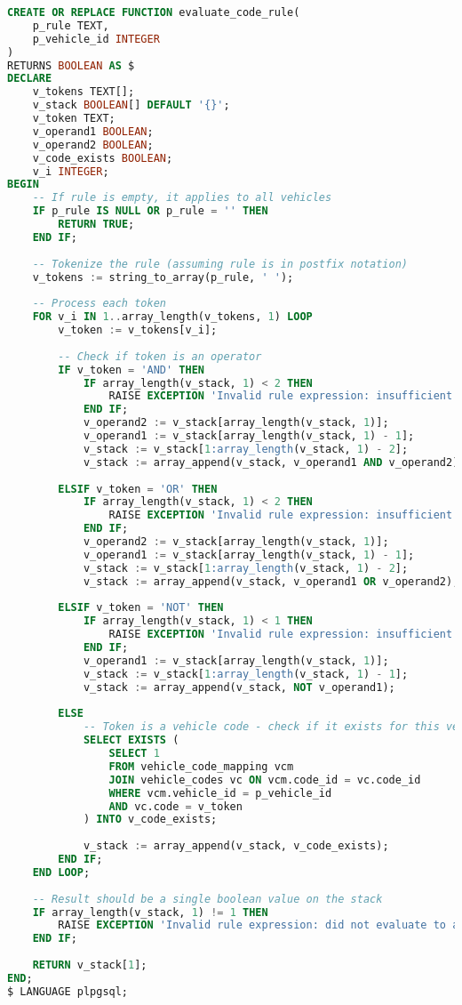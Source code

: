\begin{lstlisting}[language=SQL, caption={Code Rule Evaluation Implementation}, label={lst:code-rule-evaluation}]
CREATE OR REPLACE FUNCTION evaluate_code_rule(
    p_rule TEXT,
    p_vehicle_id INTEGER
)
RETURNS BOOLEAN AS $
DECLARE
    v_tokens TEXT[];
    v_stack BOOLEAN[] DEFAULT '{}';
    v_token TEXT;
    v_operand1 BOOLEAN;
    v_operand2 BOOLEAN;
    v_code_exists BOOLEAN;
    v_i INTEGER;
BEGIN
    -- If rule is empty, it applies to all vehicles
    IF p_rule IS NULL OR p_rule = '' THEN
        RETURN TRUE;
    END IF;
    
    -- Tokenize the rule (assuming rule is in postfix notation)
    v_tokens := string_to_array(p_rule, ' ');
    
    -- Process each token
    FOR v_i IN 1..array_length(v_tokens, 1) LOOP
        v_token := v_tokens[v_i];
        
        -- Check if token is an operator
        IF v_token = 'AND' THEN
            IF array_length(v_stack, 1) < 2 THEN
                RAISE EXCEPTION 'Invalid rule expression: insufficient operands for AND';
            END IF;
            v_operand2 := v_stack[array_length(v_stack, 1)];
            v_operand1 := v_stack[array_length(v_stack, 1) - 1];
            v_stack := v_stack[1:array_length(v_stack, 1) - 2];
            v_stack := array_append(v_stack, v_operand1 AND v_operand2);
            
        ELSIF v_token = 'OR' THEN
            IF array_length(v_stack, 1) < 2 THEN
                RAISE EXCEPTION 'Invalid rule expression: insufficient operands for OR';
            END IF;
            v_operand2 := v_stack[array_length(v_stack, 1)];
            v_operand1 := v_stack[array_length(v_stack, 1) - 1];
            v_stack := v_stack[1:array_length(v_stack, 1) - 2];
            v_stack := array_append(v_stack, v_operand1 OR v_operand2);
            
        ELSIF v_token = 'NOT' THEN
            IF array_length(v_stack, 1) < 1 THEN
                RAISE EXCEPTION 'Invalid rule expression: insufficient operands for NOT';
            END IF;
            v_operand1 := v_stack[array_length(v_stack, 1)];
            v_stack := v_stack[1:array_length(v_stack, 1) - 1];
            v_stack := array_append(v_stack, NOT v_operand1);
            
        ELSE
            -- Token is a vehicle code - check if it exists for this vehicle
            SELECT EXISTS (
                SELECT 1
                FROM vehicle_code_mapping vcm
                JOIN vehicle_codes vc ON vcm.code_id = vc.code_id
                WHERE vcm.vehicle_id = p_vehicle_id
                AND vc.code = v_token
            ) INTO v_code_exists;
            
            v_stack := array_append(v_stack, v_code_exists);
        END IF;
    END LOOP;
    
    -- Result should be a single boolean value on the stack
    IF array_length(v_stack, 1) != 1 THEN
        RAISE EXCEPTION 'Invalid rule expression: did not evaluate to a single result';
    END IF;
    
    RETURN v_stack[1];
END;
$ LANGUAGE plpgsql;
\end{lstlisting}

